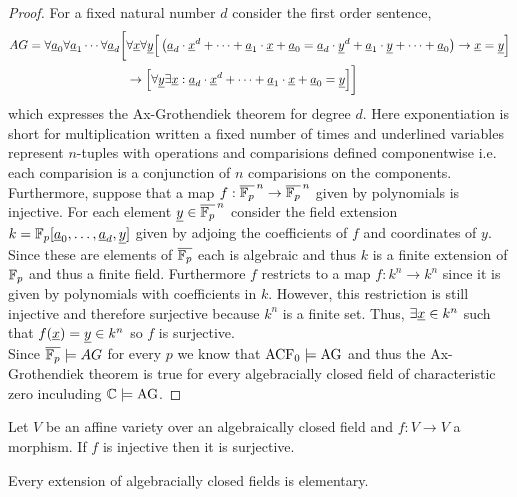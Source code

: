 \documentclass[12pt]{article}
\begin{document}
\begin{proof}
For a fixed natural number $d$ consider the first order sentence,
\begin{align*}
AG = \forall \underline{a}_0 \forall \underline{a}_1 \cdots \forall \underline{a}_d \bigg[ &  \forall \underline{x} \forall \underline{y} \Big[ \left( \underline{a}_d \cdot \underline{x}^d + \cdots + \underline{a}_1 \cdot \underline{x} + \underline{a}_0 = \underline{a}_d \cdot \underline{y}^d + \underline{a}_1 \cdot \underline{y} + \cdots + \underline{a}_0 \right) \to \underline{x} = \underline{y} \Big]
\\
&\to \Big[ \forall \underline{y} \exists \underline{x} : \underline{a}_d \cdot \underline{x}^d + \cdots + \underline{a}_1 \cdot \underline{x} + \underline{a}_0 = \underline{y}  \Big] \bigg]
\end{align*}
which expresses the Ax-Grothendiek theorem for degree $d$. Here exponentiation is short for multiplication written a fixed number of times and underlined variables represent $n$-tuples with operations and comparisions defined componentwise i.e. each comparision is a conjunction of $n$ comparisions on the components. Furthermore, suppose that a map $f : \overline{\mathbb{F}_{p}}^{\,n} \to \overline{\mathbb{F}_{p}}^{\,n}$ given by polynomials is injective. For each element $\underline{y} \in \overline{\mathbb{F}_{p}}^{\,n}$ consider the field extension $k = \mathbb{F}_{p}[\underline{a}_0, \dots, \underline{a}_d, \underline{y}]$ given by adjoing the coefficients of $f$ and coordinates of $y$. Since these are elements of $\overline{\mathbb{F}_{p}}$ each is algebraic and thus $k$ is a finite extension of $\mathbb{F}_{p}$ and thus a finite field. Furthermore $f$ restricts to a map $f : k^n \to k^n$ since it is given by polynomials with coefficients in $k$. However, this restriction is still injective and therefore surjective because $k^n$ is a finite set. Thus, $\exists \underline{x} \in k^n$ such that $f(\underline{x}) = \underline{y} \in k^n$ so $f$ is surjective. 
\bigskip\\
Since $\overline{\mathbb{F}_{p}} \models AG$ for every $p$ we know that $\mathrm{ACF}_{0} \models \rm{AG}$ and thus the Ax-Grothendiek theorem is true for every algebracially closed field of characteristic zero inculuding $\mathbb{C} \models \rm{AG}$. 
\end{proof}

\begin{theorem}
Let $V$ be an affine variety over an algebraically closed field and $f : V \to V$ a morphism. If $f$ is injective then it is surjective. 
\end{theorem}

\begin{theorem}
Every extension of algebracially closed fields is elementary.
\end{theorem}
\end{document}
